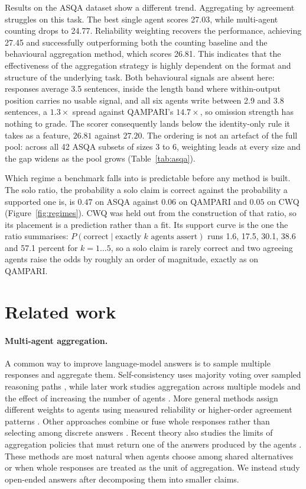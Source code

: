 \documentclass{article}
\begin{document}
Results on the ASQA dataset show a different trend. Aggregating by agreement struggles on this task. The best single agent scores 27.03, while multi-agent counting drops to 24.77. Reliability weighting recovers the performance, achieving 27.45 and successfully outperforming both the counting baseline and the behavioural aggregation method, which scores 26.81. This indicates that the effectiveness of the aggregation strategy is highly dependent on the format and structure of the underlying task. Both behavioural signals are absent here: responses average 3.5 sentences, inside the length band where within-output position carries no usable signal, and all six agents write between 2.9 and 3.8 sentences, a $1.3\times$ spread against QAMPARI's $14.7\times$, so omission strength has nothing to grade. The scorer consequently lands below the identity-only rule it takes as a feature, $26.81$ against $27.20$. The ordering is not an artefact of the full pool: across all 42 ASQA subsets of sizes 3 to 6, weighting leads at every size and the gap widens as the pool grows (Table~\ref{tab:asqa}).

Which regime a benchmark falls into is predictable before any method is built. The solo ratio, the probability a solo claim is correct against the probability a supported one is, is $0.47$ on ASQA against $0.06$ on QAMPARI and $0.05$ on CWQ (Figure~\ref{fig:regimes}). CWQ was held out from the construction of that ratio, so its placement is a prediction rather than a fit. Its support curve is the one the ratio summarises: $P(\mathrm{correct} \mid \text{exactly } k \text{ agents assert})$ runs 1.6, 17.5, 30.1, 38.6 and 57.1 percent for $k = 1 \dots 5$, so a solo claim is rarely correct and two agreeing agents raise the odds by roughly an order of magnitude, exactly as on QAMPARI.

\section{Related work}
\label{sec:related}

\paragraph{Multi-agent aggregation.}
A common way to improve language-model answers is to sample multiple responses and aggregate them. Self-consistency uses majority voting over sampled reasoning paths \cite{wang2022self}, while later work studies aggregation across multiple models and the effect of increasing the number of agents \cite{li2024agents}. More general methods assign different weights to agents using measured reliability or higher-order agreement patterns \cite{ai2025majority}. Other approaches combine or fuse whole responses rather than selecting among discrete answers \cite{jiang2023llm,chen2023universal}. Recent theory also studies the limits of aggregation policies that must return one of the answers produced by the agents \cite{ananthakrishnan2026power}. These methods are most natural when agents choose among shared alternatives or when whole responses are treated as the unit of aggregation. We instead study open-ended answers after decomposing them into smaller claims.
\end{document}
